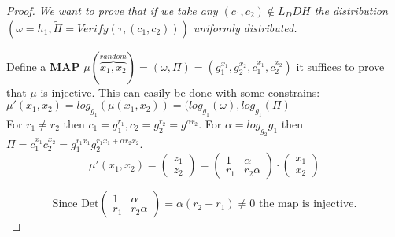 \begin{proof}

    \textit{We want to prove that if we take any $(c_1,c_2)\notin L_DDH$ the distribution $(\omega=h_1, \widetilde{\Pi}=Verify(\tau,(c_1,c_2)))$ uniformly distributed.}

    Define a \textbf{MAP} $\mu(\overbrace{x_1,x_2}^{random})=(\omega,\Pi)=(g_1^{x_1},g_2^{x_2},c_1^{x_1},c_2^{x_2})$ it suffices to prove that $\mu$ is injective. This can easily be done with some constrains:
    $\mu'(x_1,x_2)=log_{g_1}(\mu(x_1,x_2))=(log_{g_1}(\omega),log_{g_1}(\Pi)$\\
    For $r_1\neq r_2$ then $c_1=g_1^{r_1},c_2=g_2^{r_2}=g^{\alpha r_2}$. For $\alpha=log_{g_2}g_1$ then $\Pi=c_1^{x_1}c_2^{x_2}=g_1^{r_1x_1}g_2^{r_1x_1+\alpha r_2x_2}$.\\
    \[\mu'(x_1,x_2)=
        \begin{pmatrix}
            z_1\\
            z_2
        \end{pmatrix}
        =
        \begin{pmatrix}
            1 & \alpha \\
            r_1 & r_2\alpha 
        \end{pmatrix}
        \cdot
        \begin{pmatrix}
            x_1\\
            x_2
        \end{pmatrix}
    \]

    \[ \text{Since Det}
    \begin{pmatrix}
        1 & \alpha \\
        r_1 & r_2\alpha 
    \end{pmatrix}=
    \alpha(r_2-r_1)\neq 0
    \text{ the map is injective.}
    \] 

\end{proof}

